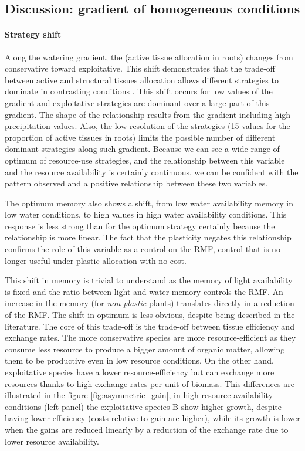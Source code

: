 \subsection{Discussion: gradient of homogeneous conditions}

\paragraph{Strategy shift}
Along the watering gradient, the  (active tissue allocation in roots) changes from conservative toward exploitative. This shift demonstrates that the trade-off between active and structural tissues allocation allows different strategies to dominate in contrasting conditions \parencite{wright_worldwide_2004}. This shift occurs for low values of the gradient and exploitative strategies are dominant over a large part of this gradient. The shape of the relationship results from the gradient including high precipitation values. Also, the low resolution of the strategies (15 values for the proportion of active tissues in roots) limits the possible number of different dominant strategies along such gradient. Because we can see a wide range of optimum of resource-use strategies, and the relationship between this variable and the resource availability is certainly continuous, we can be confident with the pattern observed and a positive relationship between these two variables.

The optimum memory also shows a shift, from low water availability memory in low water conditions, to high values in high water availability conditions. This response is less strong than for the optimum strategy certainly because the relationship is more linear. The fact that the plasticity negates this relationship confirms the role of this variable as a control on the RMF, control that is no longer useful under plastic allocation with no cost.

This shift in memory is trivial to understand as the memory of light availability is fixed and the ratio between light and water memory controls the RMF. An increase in the memory (for \textit{non plastic} plants) translates directly in a reduction of the RMF. The shift in optimum is less obvious, despite being described in the literature. The core of this trade-off is the trade-off between tissue efficiency and exchange rates. The more conservative species are more resource-efficient as they consume less resource to produce a bigger amount of organic matter, allowing them to be productive even in low resource conditions. On the other hand, exploitative species have a lower resource-efficiency but can exchange more resources thanks to high exchange rates per unit of biomass. This differences are illustrated in the figure \ref{fig:asymmetric_gain}, in high resource availability conditions (left panel) the exploitative species B show higher growth, despite having lower efficiency (costs relative to gain are higher), while its growth is lower when the gains are reduced linearly by a reduction of the exchange rate due to lower resource availability. 

